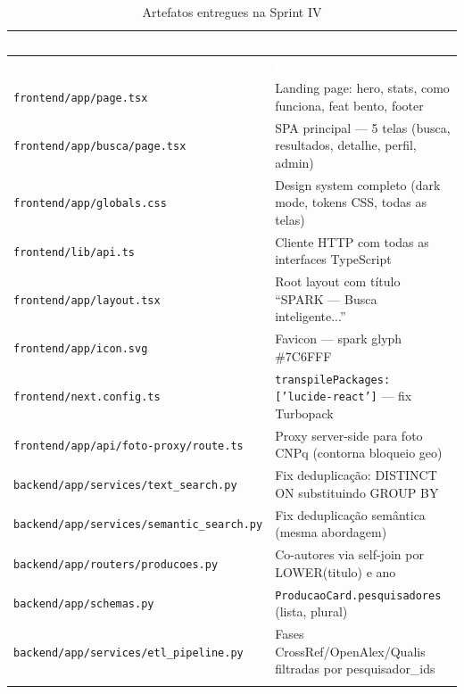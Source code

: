 \documentclass[12pt,a4paper]{article}
\begin{document}
\begin{longtable}{L{6cm} L{7.5cm}}
  \toprule
  \textcolor{white}{\textbf{Arquivo}} &
  \textcolor{white}{\textbf{Descrição}} \\
  \midrule
  \endfirsthead
  \toprule
  \textcolor{white}{\textbf{Arquivo}} &
  \textcolor{white}{\textbf{Descrição}} \\
  \midrule
  \endhead
  \texttt{frontend/app/page.tsx}                      & Landing page: hero, stats, como funciona, feat bento, footer \\
  \texttt{frontend/app/busca/page.tsx}                & SPA principal — 5 telas (busca, resultados, detalhe, perfil, admin) \\
  \texttt{frontend/app/globals.css}                   & Design system completo (dark mode, tokens CSS, todas as telas) \\
  \texttt{frontend/lib/api.ts}                        & Cliente HTTP com todas as interfaces TypeScript \\
  \texttt{frontend/app/layout.tsx}                    & Root layout com título ``SPARK — Busca inteligente...'' \\
  \texttt{frontend/app/icon.svg}                      & Favicon — spark glyph \textcolor{sparkblue}{\#7C6FFF} \\
  \texttt{frontend/next.config.ts}                    & \texttt{transpilePackages: ['lucide-react']} — fix Turbopack \\
  \texttt{frontend/app/api/foto-proxy/route.ts}       & Proxy server-side para foto CNPq (contorna bloqueio geo) \\
  \texttt{backend/app/services/text\_search.py}       & Fix deduplicação: DISTINCT ON substituindo GROUP BY \\
  \texttt{backend/app/services/semantic\_search.py}   & Fix deduplicação semântica (mesma abordagem) \\
  \texttt{backend/app/routers/producoes.py}           & Co-autores via self-join por LOWER(titulo) e ano \\
  \texttt{backend/app/schemas.py}                     & \texttt{ProducaoCard.pesquisadores} (lista, plural) \\
  \texttt{backend/app/services/etl\_pipeline.py}      & Fases CrossRef/OpenAlex/Qualis filtradas por pesquisador\_ids \\
  \bottomrule
  \caption{Artefatos entregues na Sprint IV}
\end{longtable}
\end{document}
